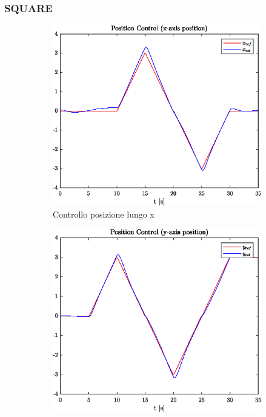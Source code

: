 \subsubsection{SQUARE}
\begin{figure}
	\centering
	\begin{subfigure}{0.45\textwidth}
		\centering
		\includegraphics[width=1\textwidth]{Simulazioni/Figure/PID/SQUARE/PositionControlXPos}
		\caption{Controllo posizione lungo x}
	\end{subfigure}
	\hfill
	\begin{subfigure}{0.45\textwidth}
		\centering
		\includegraphics[width=1\textwidth]{Simulazioni/Figure/PID/SQUARE/PositionControlYPos}

\end{subfigure}
\end{figure}
